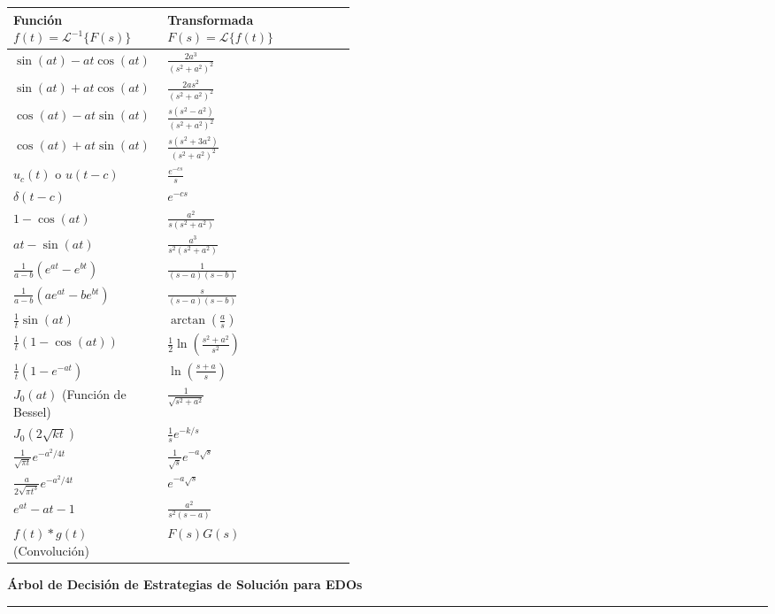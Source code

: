 \documentclass[10pt, landscape, twocolumn]{article}
\newcommand{\cheatsheetsection}[1]{
    \vspace{0.6em}
    {\color{themeblue}\large\bfseries #1} \par
    \vspace{-0.5em}
    {\color{themeblue}\rule{\linewidth}{1pt}} \par
    \vspace{0.2em}
}
\begin{document}
\begin{tabularx}{\linewidth}{|p{0.45\linewidth}|X|}
\hline
\textbf{Función $f(t) = \mathcal{L}^{-1}\{F(s)\}$} & \textbf{Transformada $F(s) = \mathcal{L}\{f(t)\}$} \\ \hline
$\sin(at) - at \cos(at)$ & $\frac{2a^3}{(s^2+a^2)^2}$ \\ \hline
$\sin(at) + at \cos(at)$ & $\frac{2as^2}{(s^2+a^2)^2}$ \\ \hline
$\cos(at) - at \sin(at)$ & $\frac{s(s^2-a^2)}{(s^2+a^2)^2}$ \\ \hline
$\cos(at) + at \sin(at)$ & $\frac{s(s^2+3a^2)}{(s^2+a^2)^2}$ \\ \hline
$u_c(t)$ o $u(t-c)$ & $\frac{e^{-cs}}{s}$ \\ \hline
$\delta(t-c)$ & $e^{-cs}$ \\ \hline
$1 - \cos(at)$ & $\frac{a^2}{s(s^2+a^2)}$ \\ \hline
$at - \sin(at)$ & $\frac{a^3}{s^2(s^2+a^2)}$ \\ \hline
$\frac{1}{a-b}(e^{at} - e^{bt})$ & $\frac{1}{(s-a)(s-b)}$ \\ \hline
$\frac{1}{a-b}(a e^{at} - b e^{bt})$ & $\frac{s}{(s-a)(s-b)}$ \\ \hline
$\frac{1}{t}\sin(at)$ & $\arctan\left(\frac{a}{s}\right)$ \\ \hline
$\frac{1}{t}(1 - \cos(at))$ & $\frac{1}{2}\ln\left(\frac{s^2+a^2}{s^2}\right)$ \\ \hline
$\frac{1}{t}(1 - e^{-at})$ & $\ln\left(\frac{s+a}{s}\right)$ \\ \hline
$J_0(at)$ (Función de Bessel) & $\frac{1}{\sqrt{s^2+a^2}}$ \\ \hline
$J_0(2\sqrt{kt})$ & $\frac{1}{s}e^{-k/s}$ \\ \hline
$\frac{1}{\sqrt{\pi t}}e^{-a^2/4t}$ & $\frac{1}{\sqrt{s}}e^{-a\sqrt{s}}$ \\ \hline
$\frac{a}{2\sqrt{\pi t^3}}e^{-a^2/4t}$ & $e^{-a\sqrt{s}}$ \\ \hline
$e^{at} - at - 1$ & $\frac{a^2}{s^2(s-a)}$ \\ \hline
$f(t) * g(t)$ (Convolución) & $F(s)G(s)$ \\ \hline
\end{tabularx}
\endgroup

\clearpage
\onecolumn

\cheatsheetsection{Árbol de Decisión de Estrategias de Solución para EDOs}
\vspace{1em}
\end{document}
